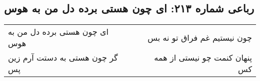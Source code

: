 \begin{center}
\section*{رباعی شماره ۲۱۳: ای چون هستی برده دل من به هوس}
\label{sec:sh213}
\begin{longtable}{l p{0.5cm} r}
ای چون هستی برده دل من به هوس
&&
چون نیستیم غم فراق تو نه بس
\\
گر چون هستی به دستت آرم زین پس
&&
پنهان کنمت چو نیستی از همه کس
\\
\end{longtable}
\end{center}
